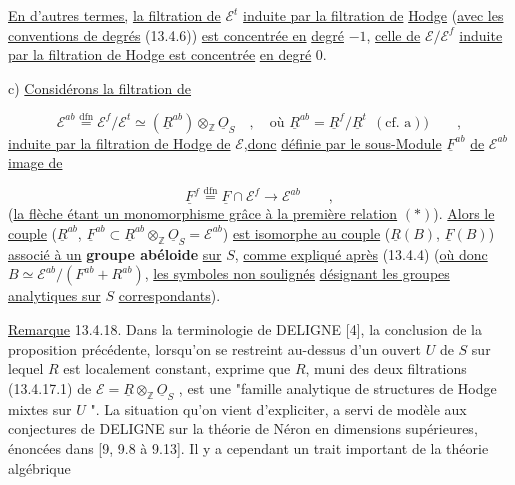 
\underline{En d'autres termes,} \underline{la filtration de} $\mathcal{E}^t$ \underline{induite par la filtration de} \underline{Hodge} (\underline{avec les conventions de degrés} (13.4.6)) \underline{est concentrée en} \underline{degré} $-1$, \underline{celle de} $\mathcal{E}/\mathcal{E}^f$ \underline{induite par la filtration de Hodge est concentrée} \underline{en degré} $0$.

c) \underline{Considérons la filtration de}

\begin{equation*}
\mathcal{E}^{ab} \overset{\mathrm{dfn}}{=} \mathcal{E}^f/\mathcal{E}^t \simeq (\underline{R}^{ab}) \otimes_{\mathbb{Z}} \underline{O}_S \quad , \quad \text{où } \underline{R}^{ab} = \underline{R}^f/\underline{R}^t \ \ (\text{cf. a})) \qquad ,
\end{equation*}
\underline{induite par la filtration de Hodge de} $\mathcal{E}$,\underline{donc} \underline{définie par le sous-Module} $\underline{F}^{ab}$ \underline{de} $\mathcal{E}^{ab}$ \underline{image de}

\begin{equation*}
\underline{F}^f \overset{\mathrm{dfn}}{=} \underline{F} \cap \mathcal{E}^f \longrightarrow \mathcal{E}^{ab} \qquad ,
\end{equation*}
(\underline{la flèche étant un monomorphisme grâce à la première relation} $(*)$). \underline{Alors le couple} ($\underline{R}^{ab}$, $\underline{F}^{ab} \subset \underline{R}^{ab} \otimes_{\mathbb{Z}} \underline{O}_S = \mathcal{E}^{ab}$) \underline{est isomorphe au couple} ($\underline{R}(B)$, $\underline{F}(B)$) \underline{associé à un} \textbf{groupe abéloide} \underline{sur} $S$, \underline{comme expliqué après} (13.4.4) (\underline{où donc} $B \simeq \mathcal{E}^{ab}/(F^{ab}+ R^{ab})$, \underline{les symboles non soulignés} \underline{désignant les groupes analytiques sur} $S$ \underline{correspondants}).

\underline{Remarque} 13.4.18. Dans la terminologie de DELIGNE [4], la conclusion de la proposition précédente, lorsqu'on se restreint au-dessus d'un ouvert $U$ de $S$ sur lequel $R$ est localement constant, exprime que $R$, muni des deux filtrations (13.4.17.1) de $\mathcal{E} = \underline{R} \otimes_{\mathbb{Z}} \underline{O}_S$ , est une "famille analytique de structures de Hodge mixtes sur $U$ ". La situation qu'on vient d'expliciter, a servi de modèle aux conjectures de DELIGNE sur la théorie de Néron en dimensions supérieures, énoncées dans [9, 9.8 à 9.13]. Il y a cependant un trait important de la théorie algébrique


